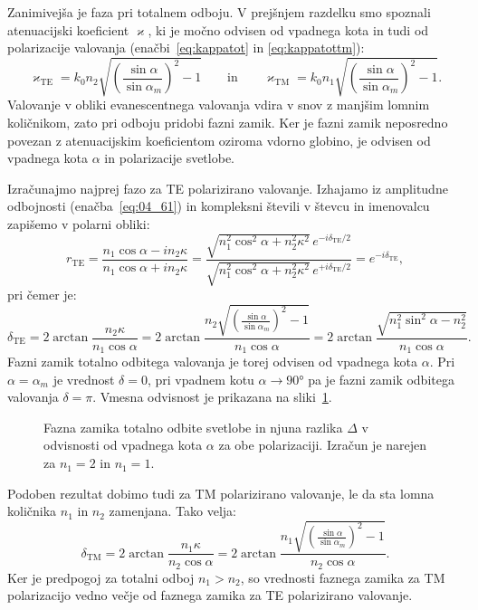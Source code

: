 Zanimivejša je faza pri totalnem odboju. V prejšnjem razdelku smo spoznali atenuacijski 
koeficient
$\varkappa$, ki je močno odvisen od vpadnega kota in tudi od polarizacije 
valovanja (enačbi~\ref{eq:kappatot} 
in \ref{eq:kappatottm}):
\begin{equation}
\varkappa_{\mathrm{TE}}= k_0 n_2 \sqrt{\left(\frac{\sin \alpha}{\sin \alpha_m}\right)^2-1} 
\qquad \mathrm{in}\qquad
\varkappa_{\mathrm{TM}}= k_0 n_1 \sqrt{\left(\frac{\sin \alpha}{\sin \alpha_m}\right)^2-1}.
\label{eq:04_83}
\end{equation}
Valovanje v obliki evanescentnega valovanja vdira v snov z manjšim lomnim količnikom, zato
pri odboju pridobi fazni zamik. Ker je fazni zamik neposredno povezan z atenuacijskim
koeficientom oziroma vdorno globino, je odvisen od vpadnega kota $\alpha$ in polarizacije svetlobe. 

Izračunajmo najprej fazo za TE polarizirano valovanje.
Izhajamo iz amplitudne odbojnosti (enačba~\ref{eq:04_61})
in kompleksni števili v števcu in imenovalcu zapišemo v polarni obliki:
\begin{equation}
r_\mathrm{TE} = \frac{n_1 \cos \alpha - i n_2 \kappa}{n_1 \cos \alpha + i n_2 \kappa} = 
\frac{\sqrt{n_1^2\cos^2 \alpha + n_2^2 \kappa^2}\,e^{-i\delta_\mathrm{TE}/2}}{\sqrt{n_1^2\cos^2 \alpha + n_2^2 \kappa^2}\,e^{+i\delta_\mathrm{TE}/2}}
= e^{-i\delta_\mathrm{TE}},
\label{eq:04_84}
\end{equation}
pri čemer je:
\begin{equation}
\delta_\mathrm{TE} = 2\arctan\frac{n_2\kappa}{n_1 \cos \alpha} = 2\arctan\frac{n_2 \sqrt{\left(\frac{\sin \alpha}{\sin \alpha_m}\right)^2-1}}{n_1 \cos \alpha} = 
2\arctan\frac{\sqrt{n_1^2\sin^2 \alpha-n_2^2}}{n_1 \cos \alpha}.
\label{eq:04_85}
\end{equation}
Fazni zamik totalno odbitega valovanja je torej odvisen od vpadnega kota $\alpha$. 
Pri $\alpha = \alpha_m$ je vrednost $\delta=0$, pri vpadnem kotu $\alpha \to 90\si{\degree}$ pa je
fazni zamik odbitega valovanja $\delta = \pi$. Vmesna odvisnost je prikazana na sliki~\ref{fig:04_faza}.
\begin{figure}[ht]
\centering
\def\svgwidth{80truemm} 

\caption{Fazna zamika totalno odbite svetlobe in 
njuna razlika $\Delta$ v odvisnosti od vpadnega kota $\alpha$ za obe polarizaciji. Izračun 
je narejen za $n_1 = 2$ in $n_1 = 1$.}
\label{fig:04_faza}
\end{figure}

Podoben rezultat dobimo tudi za TM polarizirano valovanje, le da sta lomna količnika $n_1$ in $n_2$
zamenjana. Tako velja:
\begin{equation}
\delta_\mathrm{TM}= 2\arctan\frac{n_1\kappa}{n_2 \cos \alpha} = 2\arctan\frac{n_1 \sqrt{\left(\frac{\sin \alpha}{\sin \alpha_m}\right)^2-1}}{n_2 \cos \alpha}.
\label{eq:04_86}
\end{equation}
Ker je predpogoj za totalni odboj $n_1 > n_2$, so vrednosti faznega zamika za 
TM polarizacijo vedno večje od faznega zamika za TE polarizirano
valovanje. 

